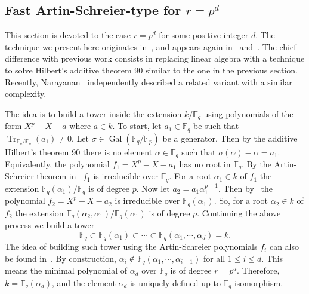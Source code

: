 \documentclass[12pt]{article}
\theoremstyle{plain}
\theoremstyle{definition}
\DeclareMathOperator{\trace}{Tr} %
\DeclareMathOperator{\gal}{Gal} %
\def\F{\ensuremath{\mathbb{F}}}
\begin{document}
\subsection{Fast Artin-Schreier-type for $r=p^d$}
\label{sec:fast-artin-schreier}

This section is devoted to the case $r = p^d$ for some positive integer $d$.
The technique we present here originates in~\cite[Lemma 5]{Adleman-Lenstra},
and appears again in~\cite{LenstraJr91} and~\cite{Allombert02}.
The chief difference with previous work consists in replacing linear algebra
with a technique to solve Hilbert's additive theorem 90 similar to the one in
the previous section.
Recently, Narayanan~\cite[Sec.~4]{narayanan2016fast} independently described
a related variant with a similar complexity.

The idea is to build a 
tower inside the extension $k/\F_q$ using polynomials of the form $X^p - X - a$ where $a \in k$. To 
start, let $a_1 \in \F_q$ be such that $\trace_{\F_q/\F_p}(a_1) \ne 0$. Let $\sigma \in 
\gal(\F_q/\F_p)$ be a generator. Then by the additive Hilbert's theorem 90 there is no element 
$\alpha \in \F_q$ such that $\sigma(\alpha) - \alpha = a_1$. Equivalently, the polynomial $f_1 = 
X^p - X - a_1$ has no root in $\F_q$. By the Artin-Schreier theorem in~\cite[Ch VI]{lang} $f_1$ 
is irreducible over $\F_q$. For a root $\alpha_1 \in k$ of $f_1$ the extension $\F_q(\alpha_1) / 
\F_q$ is of degree $p$.
Now let $a_2 = a_1\alpha_1^{p - 1}$. Then by~\cite[Lemma 5]{Adleman-Lenstra} the polynomial $f_2 = 
X^p - X - a_2$ is irreducible over $\F_q(\alpha_1)$. So, for a root $\alpha_2 \in k$ of $f_2$ the 
extension $\F_q(\alpha_2, \alpha_1) / \F_q(\alpha_1)$ is of degree $p$. Continuing the above 
process we build a tower
\begin{equation}
	\label{equ:art-sch-tower}
	\F_q \subset \F_q(\alpha_1)  \subset \cdots \subset \F_q(\alpha_1, \cdots, \alpha_d) = k.
\end{equation}
The idea of building such tower using the Artin-Schreier polynomials $f_i$ can also be found
in~\cite{LenstraJr91, Allombert02, shoup93}. By construction, $\alpha_i \notin \F_q(\alpha_1, \cdots, 
\alpha_{i - 1})$ for all $1 \le i \le d$. This means the minimal polynomial of $\alpha_d$ over 
$\F_q$ is of degree $r = p^d$. Therefore, $k = \F_q(\alpha_d)$, and the element $\alpha_d$ is 
uniquely defined up to $\F_q$-isomorphism.
\end{document}
